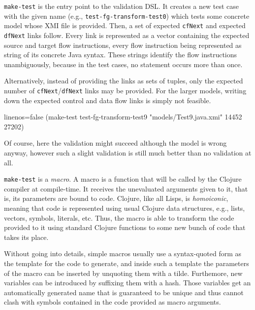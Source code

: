\documentclass[11pt]{article}
\begin{document}
\verb|make-test| is the entry point to the validation DSL.  It creates a new
test case with the given name (e.g., \verb|test-fg-transform-test0|) which
tests some concrete model whose XMI file is provided.  Then, a set of expected
\verb|cfNext| and expected \verb|dfNext| links follow.  Every link is
represented as a vector containing the expected source and target flow
instructions, every flow instruction being represented as string of its
concrete Java syntax.  These strings identify the flow instructions
unambiguously, because in the test cases, no statement occurs more than once.

Alternatively, instead of providing the links as sets of tuples, only the
expected number of \verb|cfNext|/\verb|dfNext| links may be provided.  For the
larger models, writing down the expected control and data flow links is simply
not feasible.

\begin{clojurecode*}{linenos=false}
(make-test test-fg-transform-test9 "models/Test9.java.xmi" 14452 27202)
\end{clojurecode*}

Of course, here the validation might succeed although the model is wrong
anyway, however such a slight validation is still much better than no
validation at all.

\verb|make-test| is a \emph{macro}.  A macro is a function that will be called
by the Clojure compiler at compile-time.  It receives the unevaluated arguments
given to it, that is, its parameters are bound to code.  Clojure, like all
Lisps, is \emph{homoiconic}, meaning that code is represented using usual
Clojure data structures, e.g., lists, vectors, symbols, literals, etc.  Thus,
the macro is able to transform the code provided to it using standard Clojure
functions to some new bunch of code that takes its place.

Without going into details, simple macros usually use a syntax-quoted form as
the template for the code to generate, and inside such a template the
parameters of the macro can be inserted by unquoting them with a tilde.
Furthemore, new variables can be introduced by suffixing them with a hash.
Those variables get an automatically generated name that is guaranteed to be
unique and thus cannot clash with symbols contained in the code provided as
macro arguments.
\end{document}
